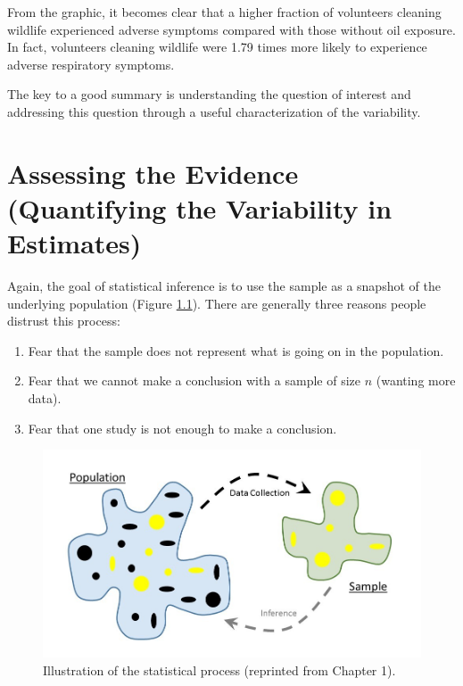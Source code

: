 \documentclass[]{book}
\providecommand{\tightlist}{%
  \setlength{\itemsep}{0pt}\setlength{\parskip}{0pt}}
\theoremstyle{definition}
\theoremstyle{definition}
\theoremstyle{definition}
\theoremstyle{remark}
\begin{document}
From the graphic, it becomes clear that a higher fraction of volunteers
cleaning wildlife experienced adverse symptoms compared with those
without oil exposure. In fact, volunteers cleaning wildlife were 1.79
times more likely to experience adverse respiratory symptoms.

The key to a good summary is understanding the question of interest and
addressing this question through a useful characterization of the
variability.

\chapter{Assessing the Evidence (Quantifying the Variability in
Estimates)}\label{SamplingDistns}

Again, the goal of statistical inference is to use the sample as a
snapshot of the underlying population (Figure
\ref{fig:samplingdistns-statistical-process}). There are generally three
reasons people distrust this process:

\begin{enumerate}
\def\labelenumi{\arabic{enumi}.}
\tightlist
\item
  Fear that the sample does not represent what is going on in the
  population.
\item
  Fear that we cannot make a conclusion with a sample of size \(n\)
  (wanting more data).
\item
  Fear that one study is not enough to make a conclusion.
\end{enumerate}

\begin{figure}

{\centering \includegraphics[width=0.8\linewidth]{images/Basics-Stat-Process} 

}

\caption{Illustration of the statistical process (reprinted from Chapter 1).}\label{fig:samplingdistns-statistical-process}
\end{figure}
\end{document}
